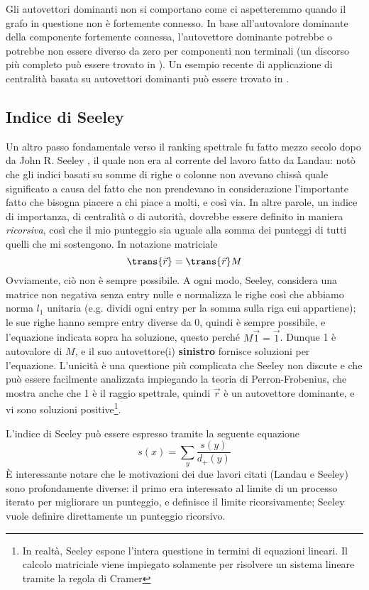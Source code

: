 Gli autovettori dominanti non si comportano come ci aspetteremmo quando il grafo in questione non è fortemente connesso. In base all'autovalore dominante della componente fortemente connessa, l'autovettore dominante potrebbe o potrebbe non essere diverso da zero per componenti non terminali (un discorso più completo può essere trovato in \cite{autovalori}).
Un esempio recente di applicazione di centralità basata su autovettori dominanti può essere trovato in \cite{calcio}.
\subsection{Indice di Seeley}
Un altro passo fondamentale verso il ranking spettrale fu fatto mezzo secolo dopo da John R. Seeley \cite{seeley}
, il quale non era al corrente del lavoro fatto da Landau: notò che gli indici basati su somme di righe o colonne non avevano chissà quale significato a causa del fatto che non prendevano in considerazione l'importante fatto che bisogna piacere a chi piace a molti, e così via. In altre parole, un indice di importanza, di centralità o di autorità, dovrebbe essere definito in maniera \textit{ricorsiva}, così che il mio punteggio sia uguale alla somma dei punteggi di tutti quelli che mi sostengono. In notazione matriciale
\begin{equation}
	\trans{\vec{r}} = \trans{\vec{r}}M
\end{equation}
Ovviamente, ciò non è sempre possibile. A ogni modo, Seeley, considera una matrice non negativa senza entry nulle e normalizza le righe così che abbiamo norma $l_1$ unitaria (e.g. dividi ogni entry per la somma sulla riga cui appartiene); le sue righe hanno sempre entry diverse da 0, quindi è sempre possibile, e l'equazione indicata sopra ha soluzione, questo perché $M\vec{1} = \vec{1}$. Dunque 1 è autovalore di $M$, e il suo autovettore(i) \textbf{sinistro} fornisce soluzioni per l'equazione. L'unicità è una questione più complicata che Seeley non discute e che può essere facilmente analizzata impiegando la teoria di Perron-Frobenius, che mostra anche che 1 è il raggio spettrale, quindi $\vec{r}$ è  un autovettore dominante, e vi sono soluzioni positive\footnote{In realtà, Seeley espone l'intera questione in termini di equazioni lineari. Il calcolo matriciale viene impiegato solamente per risolvere un sistema lineare tramite la regola di Cramer}.

L'indice di Seeley può essere espresso tramite la seguente equazione
\begin{equation}
	s(x) = \sum_y{\frac{s(y)}{d_+(y)}}
\end{equation}
È interessante notare che le motivazioni dei due lavori citati (Landau e Seeley) sono profondamente diverse: il primo era interessato al limite di un processo iterato per migliorare un punteggio, e definisce il limite ricorsivamente; Seeley vuole definire direttamente un punteggio ricorsivo.

